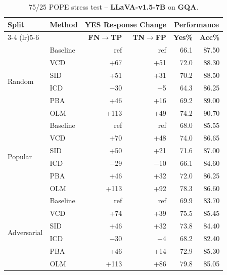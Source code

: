 \documentclass[11pt]{article}
\begin{document}
\begin{table}[ht]
\centering
\caption{75/25 POPE stress test -- \textbf{LLaVA-v1.5-7B} on \textbf{GQA}.}
\label{tab:75_25_llava_gqa}
\setlength{\tabcolsep}{6pt}
\renewcommand{\arraystretch}{1.1}
\begin{tabular}{l|l|rr|rr}
\toprule
\multirow{2}{*}{\textbf{Split}} &
\multirow{2}{*}{\textbf{Method}} &
\multicolumn{2}{c|}{\textbf{YES Response Change}} &
\multicolumn{2}{c}{\textbf{Performance}} \\
\cmidrule(lr){3-4} \cmidrule(lr){5-6}
& & \textbf{FN$\to$TP} & \textbf{TN$\to$FP} & \textbf{Yes\%} & \textbf{Acc\%} \\
\midrule

\multirow{6}{*}{Random}
& Baseline & ref    & ref   & 66.1 & 87.50 \\
& VCD      & +67    & +51   & 72.0 & 88.30 \\
& SID      & +51    & +31   & 70.2 & 88.50 \\
& ICD      & $-$30  & $-$5  & 64.3 & 86.25 \\
& PBA      & +46    & +16   & 69.2 & 89.00 \\
& OLM      & +113   & +49   & 74.2 & 90.70 \\
\midrule

\multirow{6}{*}{Popular}
& Baseline & ref    & ref   & 68.0 & 85.55 \\
& VCD      & +70    & +48   & 74.0 & 86.65 \\
& SID      & +50    & +21   & 71.6 & 87.00 \\
& ICD      & $-$29  & $-$10 & 66.1 & 84.60 \\
& PBA      & +46    & +32   & 72.0 & 86.25 \\
& OLM      & +113   & +92   & 78.3 & 86.60 \\
\midrule

\multirow{6}{*}{Adversarial}
& Baseline & ref    & ref   & 69.9 & 83.70 \\
& VCD      & +74    & +39   & 75.5 & 85.45 \\
& SID      & +46    & +32   & 73.8 & 84.40 \\
& ICD      & $-$30  & $-$4  & 68.2 & 82.40 \\
& PBA      & +46    & +14   & 72.9 & 85.30 \\
& OLM      & +113   & +86   & 79.8 & 85.05 \\
\bottomrule
\end{tabular}
\end{table}
\end{document}
